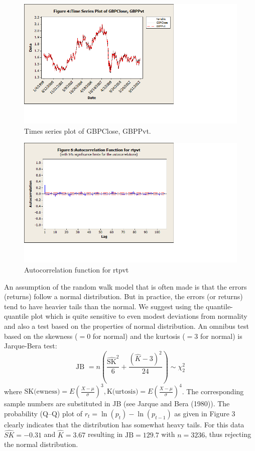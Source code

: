 	\begin{figure}[!ht]
	\centering
	\includegraphics[width=\textwidth]{chapters/chapter_uvts/figures/Sec2-4Fig4.png}
	\caption{Times series plot of GBPClose, GBPPvt. \label{fig:timegbp}}
	\end{figure}
	
	\begin{figure}[!ht]
	\centering
	\includegraphics[width=\textwidth]{chapters/chapter_uvts/figures/Sec2-4Fig5.png}
	\caption{Autocorrelation function for rtpvt \label{fig:autocorrtpvt}}
	\end{figure}
An assumption of the random walk model that is often made is that the errors (returns)
follow a normal distribution. But in practice, the errors (or returns) tend to have heavier tails than the normal. We suggest using the quantile-quantile plot which is quite sensitive to even modest deviations from normality and also a test based on the properties of normal distribution. An omnibus test based on the skewness ($=0$ for normal) and the kurtosis ($=3$ for normal) is Jarque-Bera test:
	\begin{equation}\label{eqn:2JB}
	\text{JB }= n\left(\frac{\widehat{\text{SK}}^2}{6} + \frac{(\hat{K} - 3)^2}{24}\right) \sim \chi_2^2
	\end{equation}
where $\text{SK}\text{(ewness)}= E(\frac{X-\mu}{\sigma})^3, \text{K}\text{(urtosis)} = E(\frac{X-\mu}{\sigma})^4$. The corresponding sample numbers are substituted in JB (see Jarque and Bera (1980)\cite{jarque80}). The probability (Q--Q) plot of $r_t = \ln{(p_t)} - \ln{(p_{t-1})}$ as given in Figure 3 clearly indicates that the distribution has somewhat heavy tails. For this data $\widehat{SK} = -0.31$ and $\hat{K} = 3.67$ resulting in $\text{JB}= 129.7$ with $n= 3236$, thus rejecting the normal distribution. \\


